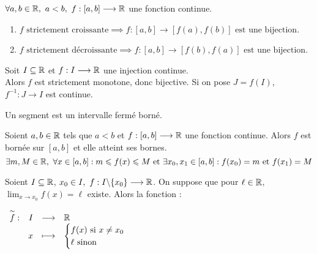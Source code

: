 \begin{theorem}
	$\forall a, b \in \mathbb{R},\ a < b,\ f : [a, b] \longrightarrow \mathbb{R}$ une fonction continue.
	\begin{enumerate}
	    \item $ f \text{ strictement croissante} \implies f : [a, b] \longrightarrow [f(a), f(b)] \text{ est une bijection} $.
            \item $ f \text{ strictement décroissante} \implies f : [a, b] \longrightarrow [f(b), f(a)] \text{ est une bijection} $.
	\end{enumerate}
\end{theorem}

\begin{theorem}
	Soit $I \subseteq \mathbb{R}$ et $f : I \longrightarrow \mathbb{R}$ une injection continue.
	\\
	Alors $f$ est strictement monotone, donc bijective. Si on pose $J = f(I)$, $f^{-1} : J \to I$ est continue.
\end{theorem}

\begin{definition}[Segment]
	Un segment est un intervalle fermé borné.
\end{definition}

\begin{theorem}
	Soient $a, b \in \mathbb{R}$ tels que $a < b$ et $f : [a, b] \longrightarrow \mathbb{R}$ une fonction continue. Alors $f$ est bornée sur $[a, b]$ et elle atteint ses bornes.
	\[ \exists m, M \in \mathbb{R},\ \forall x \in [a, b] : m \leqslant f(x) \leqslant M \text{ et } \exists x_0, x_1 \in [a, b] : f(x_0) = m \text{ et } f(x_1) = M \]
\end{theorem}

\begin{definition}
	Soient $I \subseteq \mathbb{R}$, $x_0 \in I,\ f : I\backslash\{x_0\} \longrightarrow \mathbb{R}$.
	On suppose que pour $\ell \in \mathbb{R}$, $\lim_{x \to x_0} f(x) = \ell$ existe. Alors la fonction :
	\begin{center}
		$
		\begin{array}{rrcl} \overset{\sim}{f} : & I & \longrightarrow & \mathbb{R} \\ & x & \longmapsto & 
		\begin{cases}
			f(x) \text{ si } x \neq x_0 \\
			\ell \text{ sinon}
		\end{cases}		
		 \end{array}
		$
	\end{center}
\end{definition}